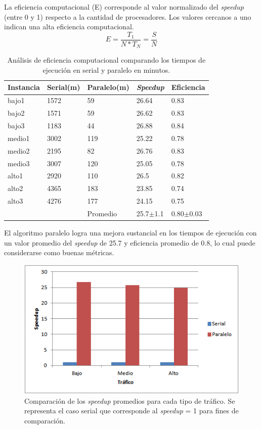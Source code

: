 La eficiencia computacional (E) corresponde al valor normalizado del \emph{speedup} (entre 0 y 1) respecto a la cantidad de procesadores. Los valores cercanos a uno indican una alta eficiencia computacional.
\begin{equation}
\label{eq:funcion_eficiencia}
E = \frac{T_1}{N*T_N} = \frac{S}{N}
\end{equation}



\begin{table}[H]
	\renewcommand{\arraystretch}{1.2}
	\caption{Análisis de eficiencia computacional comparando los tiempos de ejecución en serial y paralelo en minutos. }
	\label{table:analisis_speedup}
	\centering
	\begin{tabular}{p{2.5cm}p{2.5cm}p{2.5cm}p{2.5cm}p{2.5cm} }
		\hline
		
		Instancia& 
		Serial(m) & 
		Paralelo(m) &
		\emph{Speedup} &
		Eficiencia
		\\ 
		\hline
		bajo1  & 1572 & 59 & 26.64 & 0.83\\
		bajo2  & 1571 & 59 & 26.62 & 0.83\\
		bajo3  & 1183 & 44 & 26.88 & 0.84\\
		
		medio1  & 3002 & 119 & 25.22 & 0.78\\
		medio2  & 2195 & 82 & 26.76 & 0.83\\
		medio3  & 3007 & 120 & 25.05 & 0.78\\
		
		alto1  & 2920 & 110 & 26.5 & 0.82\\
		alto2  & 4365 & 183 & 23.85 & 0.74\\
		alto3  & 4276 & 177 & 24.15 & 0.75\\
		\hline
		  &  & Promedio & 25.7$\pm$1.1 & 0.80$\pm$0.03\\
		
		\hline
	\end{tabular}
\end{table}


El algoritmo paralelo logra una mejora sustancial en los tiempos de ejecución con un valor promedio del \emph{speedup} de 25.7  y  eficiencia promedio de 0.8, lo cual puede considerarse como buenas métricas.

\begin{figure}[H]
	\centering
	\includegraphics[width=0.8\linewidth]{Figures/speedup1}
	\caption{Comparación de los \emph{speedup} promedios para cada tipo de tráfico. Se representa el caso serial que corresponde al \emph{speedup} = 1 para fines de comparación.}
	\label{fig:speedup1}
\end{figure}

